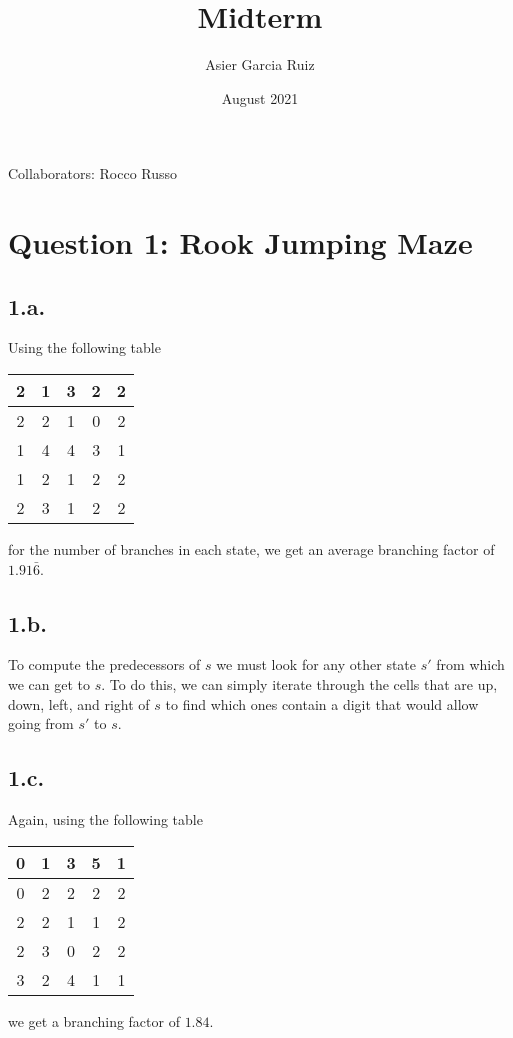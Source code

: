 \documentclass{article}
\title{Midterm}
\author{Asier Garcia Ruiz }
\date{August 2021}
\begin{document}
\maketitle

Collaborators: Rocco Russo
\section*{Question 1: Rook Jumping Maze}
\subsection*{1.a.}
Using the following table
\begin{center}
    \begin{tabular}{|c|c|c|c|c|}
        \hline
        2 & 1 & 3 & 2 & 2 \\
        \hline
        2 & 2 & 1 & 0 & 2 \\
        \hline
        1 & 4 & 4 & 3 & 1 \\
        \hline
        1 & 2 & 1 & 2 & 2 \\
        \hline
        2 & 3 & 1 & 2 & 2 \\
        \hline
    \end{tabular}
\end{center}
for the number of branches in each state, we get an average branching factor
of $1.91\bar{6}$.

\subsection*{1.b.}
To compute the predecessors of $s$ we must look for any other state $s'$ from
which we can get to $s$. To do this, we can simply iterate through the cells
that are up, down, left, and right of $s$ to find which ones contain a digit
that would allow going from $s'$ to $s$.

\subsection*{1.c.}
Again, using the following table
\begin{center}
    \begin{tabular}{|c|c|c|c|c|}
        \hline
        0 & 1 & 3 & 5 & 1 \\
        \hline
        0 & 2 & 2 & 2 & 2 \\
        \hline
        2 & 2 & 1 & 1 & 2 \\
        \hline
        2 & 3 & 0 & 2 & 2 \\
        \hline
        3 & 2 & 4 & 1 & 1 \\
        \hline
    \end{tabular}
\end{center}
we get a branching factor of $1.84$.
\end{document}
